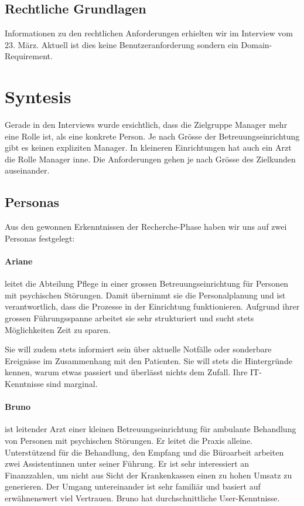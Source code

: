 \documentclass[a4paper]{scrreprt}
\begin{document}
\subsection{Rechtliche Grundlagen}
Informationen zu den rechtlichen Anforderungen erhielten wir im Interview vom 23. März. Aktuell ist dies keine Benutzeranforderung sondern ein Domain-Requirement.



\section{Syntesis}
Gerade in den Interviews wurde ersichtlich, dass die Zielgruppe Manager mehr eine Rolle ist, als eine konkrete Person. Je nach Grösse der Betreuungseinrichtung gibt es keinen expliziten Manager. In kleineren Einrichtungen hat auch ein Arzt die Rolle Manager inne.
Die Anforderungen gehen je nach Grösse des Zielkunden auseinander.

\subsection{Personas}
Aus den gewonnen Erkenntnissen der Recherche-Phase haben wir uns auf zwei Personas festgelegt:

\paragraph{Ariane} leitet die Abteilung Pflege in einer grossen Betreuungseinrichtung für Personen mit psychischen Störungen. Damit übernimmt sie die Personalplanung und ist verantwortlich, dass die Prozesse in der Einrichtung funktionieren. Aufgrund ihrer grossen Führungsspanne arbeitet sie sehr strukturiert und sucht stets Möglichkeiten Zeit zu sparen.

Sie will zudem stets informiert sein über aktuelle Notfälle oder sonderbare Ereignisse im Zusammenhang mit den Patienten. Sie will stets die Hintergründe kennen, warum etwas passiert und überlässt nichts dem Zufall. Ihre IT-Kenntnisse sind marginal.


\paragraph{Bruno} ist leitender Arzt einer kleinen Betreuungseinrichtung für ambulante Behandlung von Personen mit psychischen Störungen. Er leitet die Praxis alleine. Unterstützend für die Behandlung, den Empfang und die Büroarbeit arbeiten zwei Assistentinnen unter seiner Führung. Er ist sehr interessiert an Finanzzahlen, um nicht aus Sicht der Krankenkassen einen zu hohen Umsatz zu generieren. Der Umgang untereinander ist sehr familiär und basiert auf erwähnenswert viel Vertrauen. Bruno hat durchschnittliche User-Kenntnisse.
\end{document}
